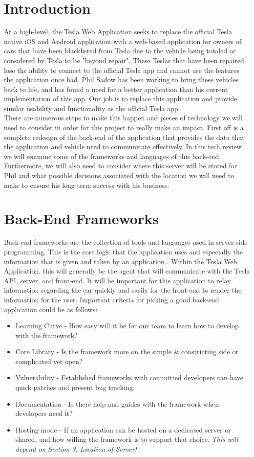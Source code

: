 \documentclass[onecolumn, draftclsnofoot,10pt, compsoc]{IEEEtran}
\begin{document}
\section*{Introduction}
At a high-level, the Tesla Web Application seeks to replace the official Tesla native iOS and Android application with a web-based application for owners of cars that have been blacklisted from Tesla due to the vehicle being totaled or considered by Tesla to be "beyond repair". These Teslas that have been repaired lose the ability to connect to the official Tesla app and cannot use the features the application once had. Phil Sadow has been working to bring these vehicles back to life, and has found a need for a better application than his current implementation of this app. Our job is to replace this application and provide similar usability and functionality as the official Tesla app. \\
There are numerous steps to make this happen and pieces of technology we will need to consider in order for this project to really make an impact. First off is a complete redesign of the back-end of the application that provides the data that the application and vehicle need to communicate effectively. In this tech review we will examine some of the frameworks and languages of this back-end. Furthermore, we will also need to consider where this server will be stored for Phil and what possible decisions associated with the location we will need to make to ensure his long-term success with his business. 
\section{Back-End Frameworks}
Back-end frameworks are the collection of tools and languages used in server-side programming. This is the core logic that the application uses and especially the information that is given and taken by an application \cite{tripathi_2018}. Within the Tesla Web Application, this will generally be the agent that will communicate with the Tesla API, server, and front-end. It will be important for this application to relay information regarding the car quickly and easily for the front-end to render the information for the user. Important criteria for picking a good back-end application could be as follows:
\begin{itemize}
    \item Learning Curve - How easy will it be for our team to learn how to develop with the framework?
    \item Core Library - Is the framework more on the simple & constricting side or complicated yet open?
    \item Vulnerability - Established frameworks with committed developers can have quick patches and present bug tracking.
    \item Documentation - Is there help and guides with the framework when developers need it?
    \item Hosting mode - If an application can be hosted on a dedicated server or shared, and how willing the framework is to support that choice. \textit{This will depend on Section 3, Location of Server!}
\end{itemize}
\end{document}
